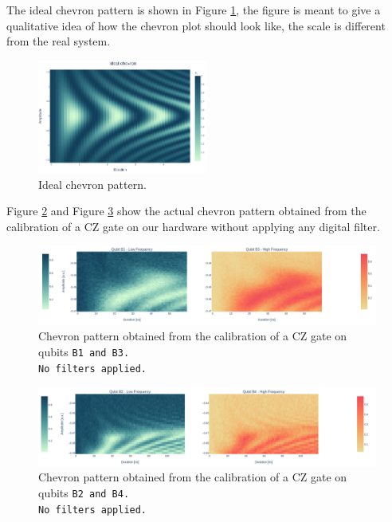 The ideal chevron pattern is shown in Figure \ref{fig:expected_chevron}, the figure is meant to give a qualitative idea of how the chevron plot should look like, the scale is different from the real system.

\begin{figure}[h!]
    \centering
    \includegraphics[width=0.5\textwidth]{figures/png/IdealChevron.png}
    \caption{Ideal chevron pattern.}
    \label{fig:expected_chevron}
\end{figure}

\newpage
{}
Figure \ref{fig:B1B3_nofilter} and Figure \ref{fig:B2B4_nofilter} show the actual chevron pattern obtained from the calibration of a CZ gate on our hardware without applying any digital filter.

\begin{figure}[h!]
    \centering
    \includegraphics[width=\textwidth]{figures/png/Cryoscope/B1B3_nofilter.png}
    \caption{Chevron pattern obtained from the calibration of a CZ gate on qubits \tt{B1} and \tt{B3}.\\ No filters applied.}
    \label{fig:B1B3_nofilter}
\end{figure}

\begin{figure}[h!]
    \centering
    \includegraphics[width=\textwidth]{figures/png/Cryoscope/B2B4_nofilter.png}
    \caption{Chevron pattern obtained from the calibration of a CZ gate on qubits \tt{B2} and \tt{B4}.\\ No filters applied.}
    \label{fig:B2B4_nofilter}
\end{figure}

